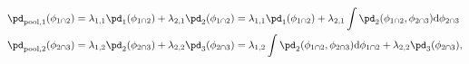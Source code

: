 \begin{align}
  \pd_{\text{pool}, 1}(\phi_{1 \cap 2}) &= \lambda_{1, 1}\pd_{1}(\phi_{1 \cap 2}) + \lambda_{2, 1}\pd_{2}(\phi_{1 \cap 2}) = \lambda_{1, 1}\pd_{1}(\phi_{1 \cap 2}) + \lambda_{2, 1}\int\pd_{2}(\phi_{1 \cap 2}, \phi_{2 \cap 3}) \text{d}\phi_{2 \cap 3} 
  \label{eqn:silly-linear-solution-1}
  \\
  \pd_{\text{pool}, 2}(\phi_{2 \cap 3}) &= \lambda_{1, 2}\pd_{2}(\phi_{2 \cap 3}) + \lambda_{2, 2}\pd_{3}(\phi_{2 \cap 3}) = \lambda_{1, 2}\int\pd_{2}(\phi_{1 \cap 2}, \phi_{2 \cap 3})\text{d}\phi_{1 \cap 2} + \lambda_{2, 2}\pd_{3}(\phi_{2 \cap 3}),
  \label{eqn:silly-linear-solution-2}
\end{align}